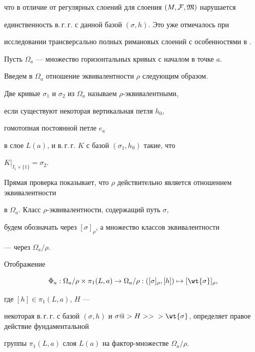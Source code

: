 что в отличие от регулярных слоений для слоения $(M,{\cal F},\frak M)$ нарушается


единственность в.\,г.\,г. с данной базой $(\sigma, h)$. Это уже отмечалось при


исследовании трансверсально полных римановых слоений с особенностями в \cite{Zs}.





Пусть $\Omega_a$ --- множество горизонтальных кривых с началом в точке $a$.


Введем в $\Omega_a$ отношение эквивалентности $\rho$ следующим образом.


Две кривые $\sigma_1$ и $\sigma_2$ из $\Omega_a$ называем $\rho$-эквивалентными,


если существуют некоторая вертикальная петля $h_0$,


гомотопная постоянной петле $e_a$


в слое $L(a)$, и  в.\,г.\,г. $K$ с базой $(\sigma_1,h_0)$ такие, что


$K|_{I_1\times\{1\}}=\sigma_2$.





Прямая проверка показывает, что $\rho$ действительно является отношением эквивалентности


в $\Omega_a$. Класс $\rho$-эквивалентности, содержащий путь $\sigma$,


будем обозначать через $[\sigma]_{\rho}$, а множество классов эквивалентности


--- через $\Omega_a/\rho$.





\begin{prop}


Отображение


$$


\Phi_a:\Omega_a/\rho\times\pi_1(L,a)\to\Omega_a/\rho: ([\sigma]_{\rho},[h])


\mapsto [\wt{\sigma}]_{\rho},


$$


где $[h]\in \pi_1(L,a)$, $H$ ---


некоторая в.\,г.\,г. с базой $(\sigma, h)$ и $\sigma@>H>>{}


>\wt{\sigma}$, определяет правое действие фундаментальной


группы $\pi_1(L,a)$ слоя $L(a)$ на фактор-множестве $\Omega_a/\rho$.


\end{prop}





